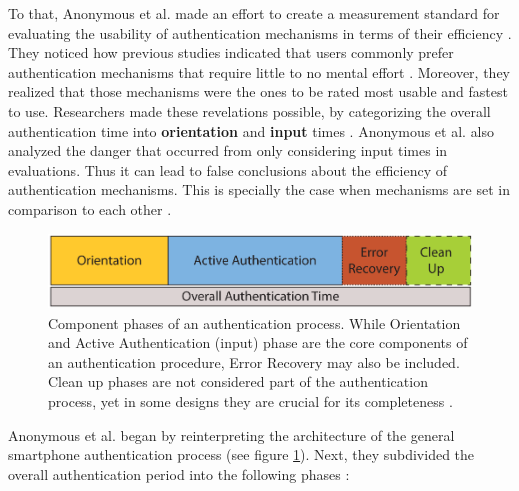 To that, Anonymous et al. \cite{anonymous} made an effort to create a measurement standard for evaluating the usability of authentication mechanisms in terms of their efficiency \cite{anonymous}. They noticed how previous studies indicated that users commonly prefer authentication mechanisms that require little to no mental effort \cite{anonymous, AnatomySmartphone}. Moreover, they realized that those mechanisms were the ones to be rated most usable and fastest to use. Researchers made these revelations possible, by categorizing the overall authentication time into \textbf{orientation} and \textbf{input} times \cite{anonymous}. Anonymous et al. \cite{anonymous} also analyzed the danger that occurred from only considering input times in evaluations. Thus it can lead to false conclusions about the efficiency of authentication mechanisms. This is specially the case when mechanisms are set in comparison to each other \cite{anonymous}. \\

\begin{figure}[t!]
\centering
\includegraphics[width=13cm, height=2cm]{Chapters/graphics/Phases.PNG}
\caption{Component phases of an authentication process. While Orientation and Active Authentication (input) phase are the core components of an authentication procedure, Error Recovery may also be included. Clean up phases are not considered part of the authentication process, yet in some designs they are crucial for its completeness \cite{anonymous}. }
\label{fig:phases}
\end{figure}

Anonymous et al. \cite{anonymous} began by reinterpreting the architecture of the general smartphone authentication process (see figure \ref{fig:phases}). Next, they subdivided the overall authentication period into the following phases \cite{anonymous}: 

